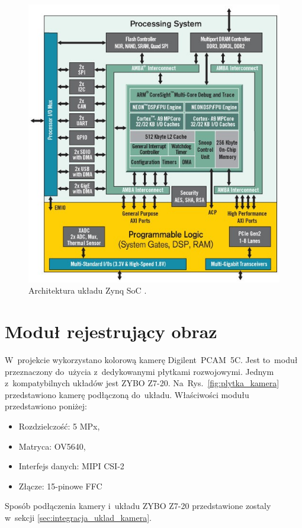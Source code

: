 \begin{figure}[h]
	\centering
	\includegraphics[width=\textwidth]{zynq.png}
	\caption{Architektura układu Zynq SoC \cite{zynq}.}
	\label{fig:zynq}
\end{figure}
\section{Moduł rejestrujący obraz}
\label{sec:pcam}
W~projekcie wykorzystano kolorową kamerę Digilent~PCAM~5C. Jest to~moduł przeznaczony do~użycia z~dedykowanymi płytkami rozwojowymi. Jednym z~kompatybilnych układów jest ZYBO Z7-20. Na~Rys.~\ref{fig:plytka_kamera} przedstawiono kamerę podłączoną do~układu. Właściwości modułu przedstawiono poniżej:
\begin{itemize}
	\item Rozdzielczość: 5 MPx,
	\item Matryca: OV5640,
	\item Interfejs danych: MIPI CSI-2
	\item Złącze: 15-pinowe FFC
\end{itemize}
Sposób podłączenia kamery i~układu ZYBO Z7-20 przedstawione zostaly w~sekcji \ref{sec:integracja_uklad_kamera}.
